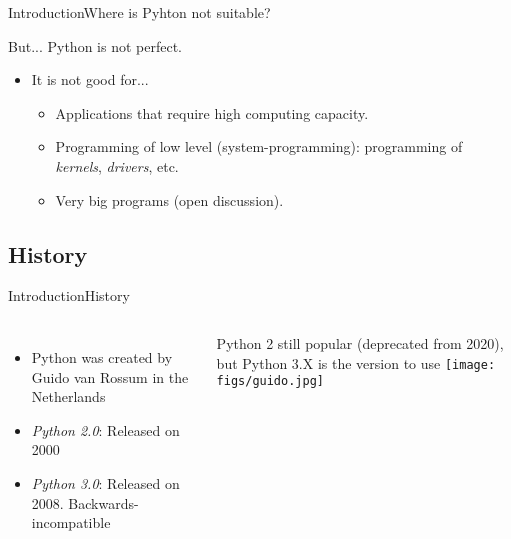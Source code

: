 \documentclass[10pt,compress]{beamer} %
\begin{document}
\begin{frame}[plain]{Introduction}{Where is Pyhton not suitable?}
	
	But... Python is not perfect.
	\begin{itemize}
	\item It is not good for...
	\begin{itemize}
	\item Applications that require high computing capacity.
	\item Programming of low level (system-programming): programming of \textit{kernels}, \textit{drivers}, etc.
	\item Very big programs (open discussion).
	\end{itemize}
	\end{itemize}
\end{frame}

\subsection{History}
\begin{frame}{Introduction}{History}
    \begin{columns}
			\begin{itemize}
				\item Python was created by Guido van Rossum in the Netherlands
				\item \textit{Python 2.0}: Released on 2000
				\item \textit{Python 3.0}: Released on 2008. Backwards-incompatible
			\end{itemize}
			\bigskip
		\centering Python 2 still popular (deprecated from 2020), but Python 3.X is the version to use 
		\centering \texttt{[image: figs/guido.jpg]}
	\end{columns}
\end{frame}
\end{document}
